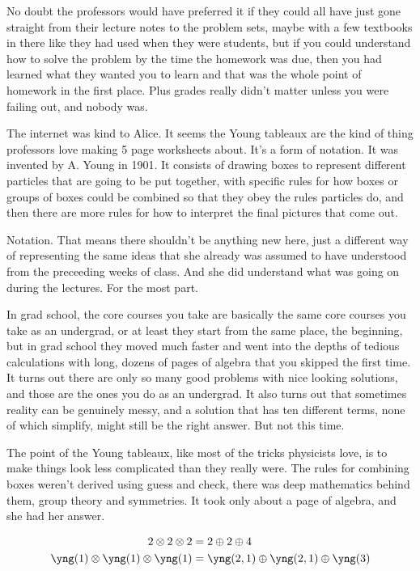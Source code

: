 No doubt the professors would have preferred it if they could all have just gone straight from their lecture notes to the problem sets, maybe with a few textbooks in there like they had used when they were students, but if you could understand how to solve the problem by the time the homework was due, then you had learned what they wanted you to learn and that was the whole point of homework in the first place. Plus grades really didn't matter unless you were failing out, and nobody was.

\mypause
 
The internet was kind to Alice. It seems the Young tableaux are the kind of thing professors love making 5 page worksheets about. It's a form of notation. It was invented by A. Young in 1901. It consists of drawing boxes to represent different particles that are going to be put together, with specific rules for how boxes or groups of boxes could be combined so that they obey the rules particles do, and then there are more rules for how to interpret the final pictures that come out. 

Notation. That means there shouldn't be anything new here, just a different way of representing the same ideas that she already was assumed to have understood from the preceeding weeks of class. And she did understand what was going on during the lectures. For the most part. 

In grad school, the core courses you take are basically the same core courses you take as an undergrad, or at least they start from the same place, the beginning, but in grad school they moved much faster and went into the depths of tedious calculations with long, dozens of pages of algebra that you skipped the first time. It turns out there are only so many good problems with nice looking solutions, and those are the ones you do as an undergrad. It also turns out that sometimes reality can be genuinely messy, and a solution that has ten different terms, none of which simplify, might still be the right answer. But not this time.

The point of the Young tableaux, like most of the tricks physicists love, is to make things look less complicated than they really were. The rules for combining boxes weren't derived using guess and check, there was deep mathematics behind them, group theory and symmetries. It took only about a page of algebra, and she had her answer.

{\begin{align*}
2\otimes 2\otimes 2 &= 2\oplus 2 \oplus 4 \\
\yng(1)\otimes\yng(1)\otimes\yng(1) &=
\yng(2,1)\oplus\yng(2,1)\oplus\yng(3)
\end{align*}}

